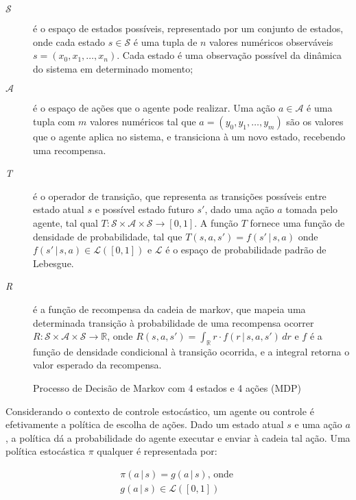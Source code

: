 \begin{description}
	\item[$\mathcal{S}$] 
	é o espaço de estados possíveis, representado por um conjunto de estados, onde cada estado $s \in \mathcal{S}$ é uma tupla de $n$ valores numéricos observáveis $s = (x_{0}, x_{1}, \ldots, x_{n})$. Cada estado é uma observação possível da dinâmica do sistema em determinado momento;
	
	\item[$\mathcal{A}$] é o espaço de ações que o agente pode realizar. Uma ação $a \in \mathcal{A}$ é uma tupla com $m$ valores numéricos tal que $a = (y_{0}, y_{1}, \ldots, y_{m})$ são os valores que o agente aplica no sistema, e transiciona à um novo estado, recebendo uma recompensa.
	
	\item[\textit{T}] é o operador de transição, que representa as transições possíveis entre estado atual $s$ e possível estado futuro $s'$, dado uma ação $a$ tomada pelo agente, tal qual \(T : \mathcal{S} \times \mathcal{A} \times \mathcal{S} \rightarrow [0, 1]\). A função $T$ fornece uma função de densidade de probabilidade, tal que $T(s, a, s') = f(s' \,|\, s, a)$ onde \(f(s' \,|\, s, a) \in \mathcal{L}([0, 1])\) e $\mathcal{L}$ é o espaço de probabilidade padrão de Lebesgue.
	
	\item[\textit{R}] é a função de recompensa da cadeia de markov, que mapeia uma determinada transição à probabilidade de uma recompensa ocorrer 
	$R : \mathcal{S} \times \mathcal{A} \times \mathcal{S} \rightarrow \mathbb{R}$, onde $R(s, a, s') = \int_{\mathbb{R}} r \cdot f(r \,|\, s, a, s') \, dr$ e $f$ é a função de densidade condicional à transição ocorrida, e a integral retorna o valor esperado da recompensa.
\end{description}

\begin{figure}[H]
	\centering
	
	\caption{Processo de Decisão de Markov com 4 estados e 4 ações (MDP)}
	\label{fig:mdp}
\end{figure}

Considerando o contexto de controle estocástico, um agente ou controle é efetivamente a política de escolha de ações. Dado um estado atual $s$ e uma ação $a$, a política dá a probabilidade do agente executar e enviar à cadeia tal ação. Uma política estocástica $\pi$ qualquer é representada por:

\begin{equation}
	\begin{aligned}
	\pi(a \,|\, s) = g(a \,|\, s)\text{, onde }\\ g(a \,|\, s) \in \mathcal{L}([0, 1])
	\end{aligned}
\end{equation}

